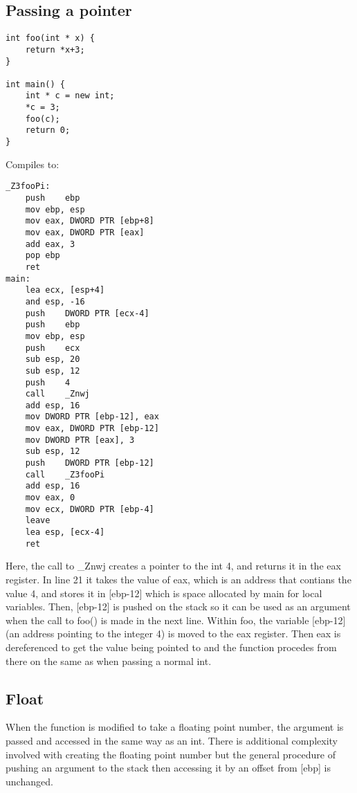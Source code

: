 \documentclass{article}
\begin{document}
\subsection{Passing a pointer}
\begin{lstlisting}
int foo(int * x) {
    return *x+3;
}

int main() {
    int * c = new int;
    *c = 3;
    foo(c);
    return 0;
}
\end{lstlisting}
Compiles to:
\begin{lstlisting}
_Z3fooPi:
	push	ebp
	mov	ebp, esp
	mov	eax, DWORD PTR [ebp+8]
	mov	eax, DWORD PTR [eax]
	add	eax, 3
	pop	ebp
	ret
main:
	lea	ecx, [esp+4]
	and	esp, -16
	push	DWORD PTR [ecx-4]
	push	ebp
	mov	ebp, esp
	push	ecx
	sub	esp, 20
	sub	esp, 12
	push	4
	call	_Znwj
	add	esp, 16
	mov	DWORD PTR [ebp-12], eax
	mov	eax, DWORD PTR [ebp-12]
	mov	DWORD PTR [eax], 3
	sub	esp, 12
	push	DWORD PTR [ebp-12]
	call	_Z3fooPi
	add	esp, 16
	mov	eax, 0
	mov	ecx, DWORD PTR [ebp-4]
	leave
	lea	esp, [ecx-4]
	ret
\end{lstlisting}
Here, the call to \_Znwj creates a pointer to the int 4, and returns it in the eax register. In line 21 it takes the value of eax, which is an address that contians the value 4, and stores it in [ebp-12] which is space allocated by main for local variables. Then, [ebp-12] is pushed on the stack so it can be used as an argument when the call to foo() is made in the next line. Within foo, the variable [ebp-12] (an address pointing to the integer 4) is moved to the eax register. Then eax is dereferenced to get the value being pointed to and the function procedes from there on the same as when passing a normal int.

\subsection{Float}
When the function is modified to take a floating point number, the argument is passed and accessed in the same way as an int. There is additional complexity involved with creating the floating point number but the general procedure of pushing an argument to the stack then accessing it by an offset from [ebp] is unchanged. 
\end{document}
